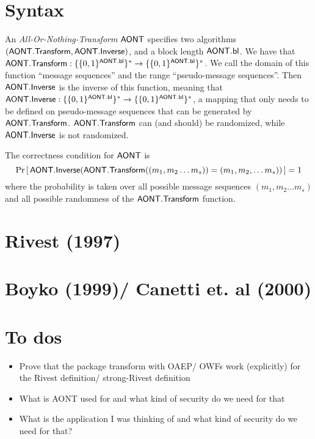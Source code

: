 \documentclass[11pt,twoside]{article}
\newcommand{\onlyinsubfile}[1]{#1}
\newcommand{\notinsubfile}[1]{}
\begin{document}
    \renewcommand{\onlyinsubfile}[1]{}
    \renewcommand{\notinsubfile}[1]{#1}
  
\section{Syntax}

An \emph{All-Or-Nothing-Transform} $\mathsf{AONT}$ specifies two algorithms $(\mathsf{AONT.Transform}, \mathsf{AONT.Inverse})$, and a block length $\mathsf{AONT.bl}$. We have that $\mathsf{AONT.Transform}: \{ \{0,1\}^{\mathsf{AONT.bl}}\}^*\rightarrow \{ \{0,1\}^{\mathsf{AONT.bl}}\}^*$. We call the domain of this function ``message sequences'' and the range ``pseudo-message sequences''. Then $\mathsf{AONT.Inverse}$ is the inverse of this function, meaning that $\mathsf{AONT.Inverse}: \{ \{0,1\}^{\mathsf{AONT.bl}}\}^*\rightarrow \{ \{0,1\}^{\mathsf{AONT.bl}}\}^*$, a mapping that only needs to be defined on pseudo-message sequences that can be generated by $\mathsf{AONT.Transform}$. $\mathsf{AONT.Transform}$ can (and should) be randomized, while $\mathsf{AONT.Inverse}$ is not randomized.

The correctness condition for $\mathsf{AONT}$ is $${\Pr\left[\,{\mathsf{AONT.Inverse}(\mathsf{AONT.Transform}((m_1,m_2\dots m_s))=(m_1,m_2,\dots m_s))}\,\right]} = 1$$ where the probability is taken over all possible message sequences $(m_1,m_2\dots m_s)$ and all possible randomness of the $\mathsf{AONT.Transform}$ function. 

\section{Rivest (1997)}

\section{Boyko (1999)/ Canetti et. al (2000)}

\section{To dos} 

\begin{itemize}
\item Prove that the package transform with OAEP/ OWFs work (explicitly) for the Rivest definition/ strong-Rivest definition
\item What is AONT used for and what kind of security do we need for that
\item What is the application I was thinking of and what kind of security do we need for that? 
\end{itemize}
\end{document}
